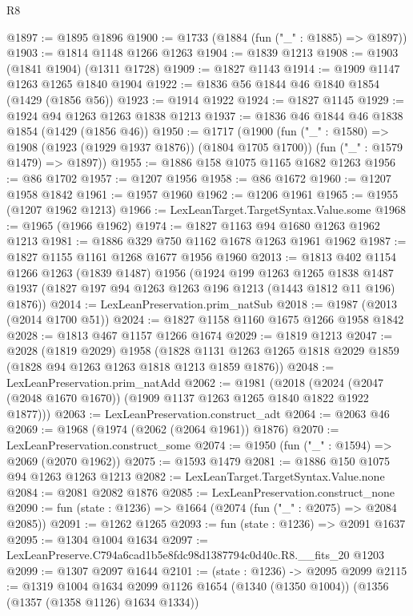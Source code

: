 \begin{lexlean}{R8}
\begin{coremodule}
@1897 := @1895 @1896
@1900 := @1733 (@1884 (fun ("_" : @1885) => @1897))
@1903 := @1814 @1148 @1266 @1263
@1904 := @1839 @1213
@1908 := @1903 (@1841 @1904) (@1311 @1728)
@1909 := @1827 @1143
@1914 := @1909 @1147 @1263 @1265 @1840 @1904
@1922 := @1836 @56 @1844 @46 @1840 @1854 (@1429 (@1856 @56))
@1923 := @1914 @1922
@1924 := @1827 @1145
@1929 := @1924 @94 @1263 @1263 @1838 @1213
@1937 := @1836 @46 @1844 @46 @1838 @1854 (@1429 (@1856 @46))
@1950 := @1717
    (@1900
      (fun ("_" : @1580) => @1908 (@1923 (@1929 @1937 @1876)) (@1804 @1705 @1700))
      (fun ("_" : @1579 @1479) => @1897))
@1955 := @1886 @158 @1075 @1165 @1682 @1263
@1956 := @86 @1702
@1957 := @1207 @1956
@1958 := @86 @1672
@1960 := @1207 @1958 @1842
@1961 := @1957 @1960
@1962 := @1206 @1961
@1965 := @1955 (@1207 @1962 @1213)
@1966 := LexLeanTarget.TargetSyntax.Value.some
@1968 := @1965 (@1966 @1962)
@1974 := @1827 @1163 @94 @1680 @1263 @1962 @1213
@1981 := @1886 @329 @750 @1162 @1678 @1263 @1961 @1962
@1987 := @1827 @1155 @1161 @1268 @1677 @1956 @1960
@2013 := @1813
    @402
    @1154
    @1266
    @1263
    (@1839 @1487)
    @1956
    (@1924
      @199
      @1263
      @1265
      @1838
      @1487
      @1937
      (@1827 @197 @94 @1263 @1263 @196 @1213 (@1443 @1812 @11 @196) @1876))
@2014 := LexLeanPreservation.prim_natSub
@2018 := @1987 (@2013 (@2014 @1700 @51))
@2024 := @1827 @1158 @1160 @1675 @1266 @1958 @1842
@2028 := @1813 @467 @1157 @1266 @1674
@2029 := @1819 @1213
@2047 := @2028
    (@1819 @2029)
    @1958
    (@1828 @1131 @1263 @1265 @1818 @2029 @1859 (@1828 @94 @1263 @1263 @1818 @1213 @1859 @1876))
@2048 := LexLeanPreservation.prim_natAdd
@2062 := @1981
    (@2018 (@2024 (@2047 (@2048 @1670 @1670)) (@1909 @1137 @1263 @1265 @1840 @1822 @1922 @1877)))
@2063 := LexLeanPreservation.construct_adt
@2064 := @2063 @46
@2069 := @1968 (@1974 (@2062 (@2064 @1961)) @1876)
@2070 := LexLeanPreservation.construct_some
@2074 := @1950 (fun ("_" : @1594) => @2069 (@2070 @1962))
@2075 := @1593 @1479
@2081 := @1886 @150 @1075 @94 @1263 @1263 @1213
@2082 := LexLeanTarget.TargetSyntax.Value.none
@2084 := @2081 @2082 @1876
@2085 := LexLeanPreservation.construct_none
@2090 := fun (state : @1236) => @1664 (@2074 (fun ("_" : @2075) => @2084 @2085))
@2091 := @1262 @1265
@2093 := fun (state : @1236) => @2091 @1637
@2095 := @1304 @1004 @1634
@2097 := LexLeanPreserve.C794a6cad1b5e8fdc98d1387794c0d40c.R8.__fits_20 @1203
@2099 := @1307 @2097 @1644
@2101 := (state : @1236) -> @2095 @2099
@2115 := @1319
    @1004
    @1634
    @2099
    @1126
    @1654
    (@1340 (@1350 @1004))
    (@1356 (@1357 (@1358 @1126) @1634 @1334))

\end{coremodule}
\end{lexlean}
